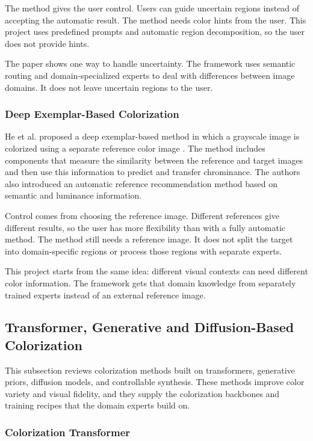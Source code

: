 \documentclass{FastFyp}
\begin{document}
The method gives the user control. Users can guide uncertain regions instead of accepting the automatic result. The method needs color hints from the user. This project uses predefined prompts and automatic region decomposition, so the user does not provide hints.

The paper shows one way to handle uncertainty. The framework uses semantic routing and domain-specialized experts to deal with differences between image domains. It does not leave uncertain regions to the user.

\subsubsection{Deep Exemplar-Based Colorization}

He et al. proposed a deep exemplar-based method in which a grayscale image is colorized using a separate reference color image \cite{ref4}. The method includes components that measure the similarity between the reference and target images and then use this information to predict and transfer chrominance. The authors also introduced an automatic reference recommendation method based on semantic and luminance information.

Control comes from choosing the reference image. Different references give different results, so the user has more flexibility than with a fully automatic method. The method still needs a reference image. It does not split the target into domain-specific regions or process those regions with separate experts.

This project starts from the same idea: different visual contexts can need different color information. The framework gets that domain knowledge from separately trained experts instead of an external reference image.

\subsection{Transformer, Generative and Diffusion-Based Colorization}

This subsection reviews colorization methods built on transformers, generative priors, diffusion models, and controllable synthesis. These methods improve color variety and visual fidelity, and they supply the colorization backbones and training recipes that the domain experts build on.

\subsubsection{Colorization Transformer}
\end{document}

